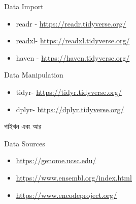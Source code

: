 \documentclass[ignorenonframetext,aspectratio=169]{beamer}
\providecommand{\tightlist}{%
  \setlength{\itemsep}{0pt}\setlength{\parskip}{0pt}}
\begin{document}
\begin{frame}[t]{Data Import}
\protect\hypertarget{data-import}{}

\begin{itemize}
\tightlist
\item
  readr - \url{https://readr.tidyverse.org/}
\item
  readxl- \url{https://readxl.tidyverse.org/}
\item
  haven - \url{https://haven.tidyverse.org/}
\end{itemize}

\end{frame}

\begin{frame}[t]{Data Manipulation}
\protect\hypertarget{data-manipulation}{}

\begin{itemize}
\tightlist
\item
  tidyr- \url{https://tidyr.tidyverse.org/}
\item
  dplyr- \url{https://dplyr.tidyverse.org/}
\end{itemize}

\end{frame}

\begin{frame}{পাইথন এবং আর}
\protect\hypertarget{ux9aaux9beux987ux9a5ux9a8-ux98fux9acux982-ux986ux9b0}{}

\end{frame}

\begin{frame}[t]{Data Sources}
\protect\hypertarget{data-sources}{}

\begin{itemize}
\tightlist
\item
  \url{https://genome.ucsc.edu/}
\item
  \url{https://www.ensembl.org/index.html}
\item
  \url{https://www.encodeproject.org/}
\end{itemize}

\end{frame}
\end{document}
